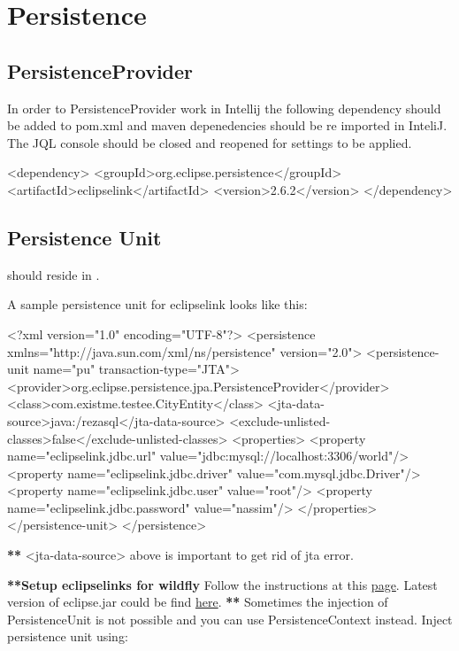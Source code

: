 \section{Persistence}
\subsection{PersistenceProvider}
In order to PersistenceProvider work in Intellij the following dependency should be added to pom.xml and maven depenedencies should be re imported in InteliJ.
The JQL console should be closed and reopened for settings to be applied.

\begin{xmlcode}
	<dependency>
	<groupId>org.eclipse.persistence</groupId>
	<artifactId>eclipselink</artifactId>
	<version>2.6.2</version>
	</dependency>
	
\end{xmlcode}
\subsection{Persistence Unit}
 should reside in .

A sample persistence unit for eclipselink looks like this:

\begin{xmlcode}
<?xml version="1.0" encoding="UTF-8"?>
<persistence xmlns="http://java.sun.com/xml/ns/persistence" version="2.0">
	<persistence-unit name="pu" transaction-type="JTA">
		<provider>org.eclipse.persistence.jpa.PersistenceProvider</provider>
		<class>com.existme.testee.CityEntity</class>
		<jta-data-source>java:/rezasql</jta-data-source>
		<exclude-unlisted-classes>false</exclude-unlisted-classes>		
		<properties>
			<property name="eclipselink.jdbc.url" value="jdbc:mysql://localhost:3306/world"/>
			<property name="eclipselink.jdbc.driver" value="com.mysql.jdbc.Driver"/>
			<property name="eclipselink.jdbc.user" value="root"/>
			<property name="eclipselink.jdbc.password" value="nassim"/>
		</properties>
	</persistence-unit>
</persistence>
\end{xmlcode}

\textbf{**} <jta-data-source> above is important to get rid of jta error.

\textbf{**Setup eclipselinks for wildfly}
Follow the instructions at this \href{http://giordanomaestro.blogspot.se/2015/02/install-jdbc-driver-on-wildfly.html}{page}. Latest version of eclipse.jar could be find \href{http://central.maven.org/maven2/mysql/mysql-connector-java/}{here}.
\textbf{**} Sometimes the injection of PersistenceUnit is not possible and you can use PersistenceContext instead.
\vspace{1cm}
Inject persistence unit using:

